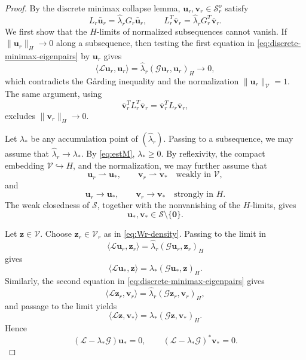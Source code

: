 \documentclass[preprint,10pt]{elsarticle}
\theoremstyle{plain}
\theoremstyle{definition}
\theoremstyle{remark}
\begin{document}
\begin{proof}
	By the discrete minimax collapse lemma,
	\(\mathbf u_r,\mathbf v_r\in\mathcal S_r^o\) satisfy
	\begin{equation}\label{eq:discrete-minimax-eigenpairs}
		L_r\bar{\mathbf u}_r
		=
		\hat\lambda_r G_r\bar{\mathbf u}_r,
		\qquad
		L_r^T\bar{\mathbf v}_r
		=
		\hat\lambda_r G_r^T\bar{\mathbf v}_r.
	\end{equation}
	We first show that the \(H\)-limits of normalized subsequences cannot vanish.
	If \(\|\mathbf u_r\|_H\to0\) along a subsequence, then testing the first
	equation in \eqref{eq:discrete-minimax-eigenpairs} by \(\mathbf u_r\) gives
	\[
	\langle\mathcal L\mathbf u_r,\mathbf u_r\rangle
	=
	\hat\lambda_r(\mathcal G\mathbf u_r,\mathbf u_r)_H
	\to
	0,
	\]
	which contradicts the G{\aa}rding inequality and the normalization
	\(\|\mathbf u_r\|_{\mathcal V}=1\). The same argument, using
	\[
	\bar{\mathbf v}_r^T L_r^T\bar{\mathbf v}_r
	=
	\bar{\mathbf v}_r^T L_r\bar{\mathbf v}_r,
	\]
	excludes \(\|\mathbf v_r\|_H\to0\).
	
	Let \(\lambda_*\) be any accumulation point of \((\hat\lambda_r)\). Passing
	to a subsequence, we may assume that \(\hat\lambda_r\to\lambda_*\). By
	\eqref{eq:estM}, \(\lambda_*\ge0\). By reflexivity, the compact embedding
	\(\mathcal V\hookrightarrow H\), and the normalization, we may further
	assume that
	\[
	\mathbf u_r\rightharpoonup\mathbf u_*,
	\qquad
	\mathbf v_r\rightharpoonup\mathbf v_*
	\quad\text{weakly in }\mathcal V,
	\]
	and
	\[
	\mathbf u_r\to\mathbf u_*,
	\qquad
	\mathbf v_r\to\mathbf v_*
	\quad\text{strongly in }H.
	\]
	The weak closedness of \(\mathcal S\), together with the nonvanishing of the
	\(H\)-limits, gives
	\[
	\mathbf u_*,\mathbf v_*
	\in
	\mathcal S\setminus\{\mathbf0\}.
	\]
	
	Let \(\mathbf z\in\mathcal V\). Choose
	\(\mathbf z_r\in\mathcal V_r\) as in \eqref{eq:Wr-density}. Passing to the
	limit in
	\[
	\langle\mathcal L\mathbf u_r,\mathbf z_r\rangle
	=
	\hat\lambda_r(\mathcal G\mathbf u_r,\mathbf z_r)_H
	\]
	gives
	\[
	\langle\mathcal L\mathbf u_*,\mathbf z\rangle
	=
	\lambda_*(\mathcal G\mathbf u_*,\mathbf z)_H.
	\]
	Similarly, the second equation in \eqref{eq:discrete-minimax-eigenpairs}
	gives
	\[
	\langle\mathcal L\mathbf z_r,\mathbf v_r\rangle
	=
	\hat\lambda_r(\mathcal G\mathbf z_r,\mathbf v_r)_H,
	\]
	and passage to the limit yields
	\[
	\langle\mathcal L\mathbf z,\mathbf v_*\rangle
	=
	\lambda_*(\mathcal G\mathbf z,\mathbf v_*)_H.
	\]
	Hence
	\begin{equation}\label{eq:LimEq}
		(\mathcal L-\lambda_*\mathcal G)\mathbf u_*=0,
		\qquad
		(\mathcal L-\lambda_*\mathcal G)^*\mathbf v_*=0.
	\end{equation}
	

\end{proof}
\end{document}
